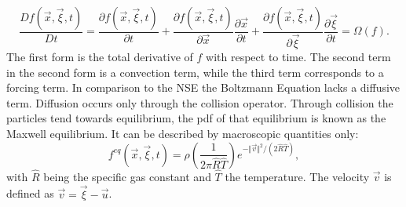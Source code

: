 \begin{equation}
	\frac{D f(\vec{x}, \vec{\xi}, t)}{Dt} = \frac{ \partial f(\vec{x}, \vec{\xi}, t)}{\partial t} + \frac{ \partial f(\vec{x}, \vec{\xi}, t)}{\partial\vec{x}} \frac{\partial \vec{x}}{\partial t} + \frac{ \partial f(\vec{x}, \vec{\xi}, t)}{\partial \vec{\xi}} \frac{\partial \vec{\xi}}{\partial t} =  \Omega(f). \label{eq:boltzmann}
\end{equation}
 The first form is the total derivative of $f$ with respect to time. The second term in the second form is a convection term, while the third term corresponds to a forcing term. In comparison to the NSE the Boltzmann Equation lacks a diffusive term. Diffusion occurs only through the collision operator. Through collision the particles tend towards equilibrium, the pdf of that equilibrium is known as the Maxwell equilibrium. It can be described by macroscopic quantities only:
\begin{equation}	
	f^{eq} (\vec{x}, \vec{\xi}, t) = \rho\left(\frac{1}{2 \pi \hat{R}\hat{T}}\right) e^{-\Vert \vec{v} \Vert^2/(2\hat{R}\hat{T}) }, \label{eq:equilibrium} 
\end{equation}
with $\hat{R}$ being the specific gas constant and $\hat{T}$ the temperature. The velocity $\vec{v}$ is defined as $\vec{v} = \vec{\xi}-\vec{u}$. \cite[p. 15- 21]{kruger_lattice_2017} \\
